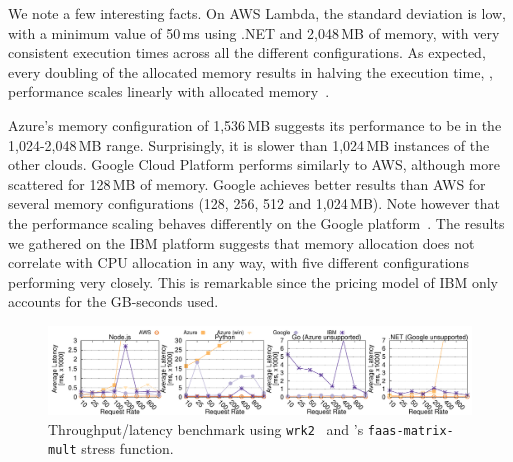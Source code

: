 We note a few interesting facts.
On \gls{AWS} Lambda, the standard deviation is low, with a minimum value of 50\,ms using .NET and  2,048\,MB of memory, with very consistent execution times across all the different configurations. 
As expected, every doubling of the allocated memory results in halving the execution time, \ie, performance scales linearly with allocated memory~\cite{AWSLambdaConfig}. 

Azure's memory configuration of 1,536\,\gls{MB} suggests its performance to be in the 1,024-2,048\,\gls{MB} range.
Surprisingly, it is slower than 1,024\,\gls{MB} instances of the other clouds.  
Google Cloud Platform performs similarly to \gls{AWS}, although more scattered for 128\,\gls{MB} of memory. 
Google achieves better results than \gls{AWS} for several memory configurations (128, 256, 512 and 1,024\,\gls{MB}). %
Note however that the performance scaling behaves differently on the Google platform~\cite{GoogleFunctionsPricing}.
The results we gathered on the \gls{IBM} platform suggests that memory allocation does not correlate with \gls{CPU} allocation in any way, with five different configurations performing very closely. 
This is remarkable since the pricing model of \gls{IBM} only accounts for the GB-seconds used. 

\begin{figure}[!t]
\centering
\includegraphics[scale=0.7]{bilder/loadtest_average_latency/tputlat_combined.pdf}
\caption{Throughput/latency benchmark using \texttt{wrk2}~\cite{wrk2} and \sys's  \texttt{faas-matrix-mult} stress function.}
\label{fig:load_test_latency_all}
\end{figure}

